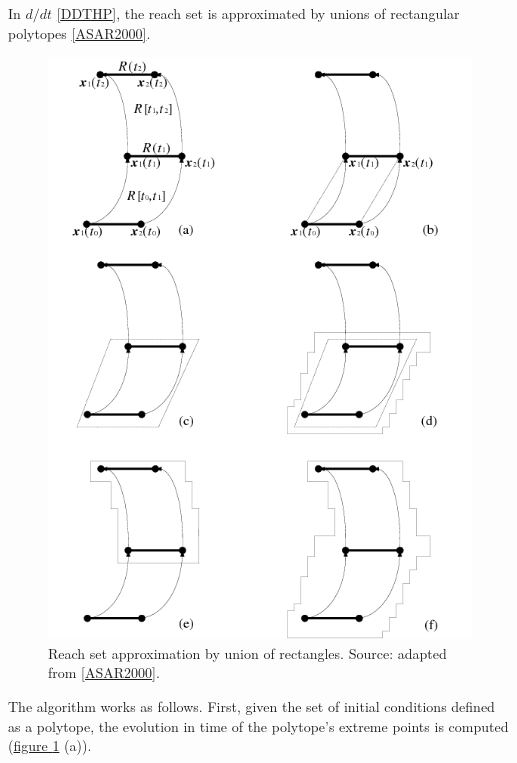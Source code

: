 \documentclass[letterpaper,10pt,english]{sphinxmanual}
\begin{document}
In $d/dt$ {\hyperref[chap_intro:ddthp]{{[}DDTHP{]}}}, the reach set is approximated by
unions of rectangular polytopes {\hyperref[chap_intro:asar2000]{{[}ASAR2000{]}}}.
\begin{figure}[htbp]
\centering
\capstart

\includegraphics{chapter01_ddt.png}
\caption{Reach set approximation by union of rectangles. Source: adapted from {\hyperref[chap_intro:asar2000]{{[}ASAR2000{]}}}.}\label{chap_intro:ddtfig}\end{figure}

The algorithm works as follows. First, given the set of initial
conditions defined as a polytope, the evolution in time of the
polytope’s extreme points is computed (\hyperref[chap_intro:ddtfig]{figure  \ref*{chap_intro:ddtfig}} (a)).
\end{document}
